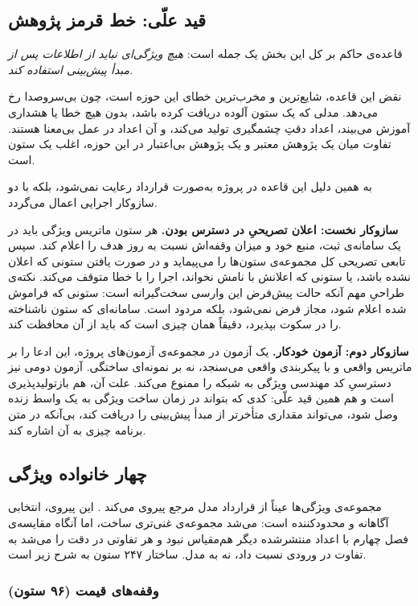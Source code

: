 \subsection*{قید علّی: خط قرمز پژوهش}

قاعده‌ی حاکم بر کل این بخش یک جمله است: \emph{هیچ ویژگی‌ای نباید از اطلاعات پس از
مبدأ پیش‌بینی استفاده کند.}

نقض این قاعده، شایع‌ترین و مخرب‌ترین خطای این حوزه است، چون بی‌سروصدا رخ می‌دهد. مدلی
که یک ستون آلوده دریافت کرده باشد، بدون هیچ خطا یا هشداری آموزش می‌بیند، اعداد دقتِ
چشمگیری تولید می‌کند، و آن اعداد در عمل بی‌معنا هستند. تفاوت میان یک پژوهش معتبر و
یک پژوهش بی‌اعتبار در این حوزه، اغلب یک ستون است.

به همین دلیل این قاعده در پروژه به‌صورت قرارداد رعایت نمی‌شود، بلکه با دو سازوکار
اجرایی اعمال می‌گردد.

\textbf{سازوکار نخست: اعلان تصریحیِ در دسترس بودن.} هر ستون ماتریس ویژگی باید در یک
سامانه‌ی ثبت، منبع خود و میزان وقفه‌اش نسبت به روز هدف را اعلام کند. سپس تابعی تصریحی
کل مجموعه‌ی ستون‌ها را می‌پیماید و در صورت یافتن ستونی که اعلان نشده باشد، یا ستونی که
اعلانش با نامش نخواند، اجرا را با خطا متوقف می‌کند. نکته‌ی طراحیِ مهم آنکه حالت
پیش‌فرض این وارسی سخت‌گیرانه است: ستونی که فراموش شده اعلام شود، مجاز فرض نمی‌شود،
بلکه مردود است. سامانه‌ای که ستون ناشناخته را در سکوت بپذیرد، دقیقاً همان چیزی است
که باید از آن محافظت کند.

\textbf{سازوکار دوم: آزمون خودکار.} یک آزمون در مجموعه‌ی آزمون‌های پروژه، این ادعا را
بر ماتریس واقعی و با پیکربندی واقعی می‌سنجد، نه بر نمونه‌ای ساختگی. آزمون دومی نیز
دسترسیِ کد مهندسی ویژگی به شبکه را ممنوع می‌کند. علت آن، هم بازتولیدپذیری است و هم
همین قید علّی: کدی که بتواند در زمان ساخت ویژگی به یک واسط زنده وصل شود، می‌تواند
مقداری متأخرتر از مبدأ پیش‌بینی را دریافت کند، بی‌آنکه در متن برنامه چیزی به آن
اشاره کند.

\subsection*{چهار خانواده ویژگی}

مجموعه‌ی ویژگی‌ها عیناً از قرارداد مدل مرجع  پیروی می‌کند
\cite{lago_forecasting_2021, lago_forecasting_2018}. این پیروی، انتخابی آگاهانه و
محدودکننده است: می‌شد مجموعه‌ی غنی‌تری ساخت، اما آنگاه مقایسه‌ی فصل چهارم با اعداد
منتشرشده دیگر هم‌مقیاس نبود و هر تفاوتی در دقت را می‌شد به تفاوت در ورودی نسبت داد،
نه به مدل. ساختار ۲۴۷ ستون به شرح زیر است.

\subsubsection*{وقفه‌های قیمت (۹۶ ستون)}

